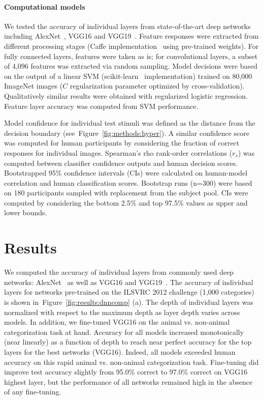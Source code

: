 \documentclass{article}
\begin{document}
\paragraph{Computational models}


We tested the accuracy of individual layers from state-of-the-art deep networks including AlexNet~\citep{Krizhevsky2012}, VGG16 and VGG19~\citep{Simonyan2014a}. Feature responses were extracted from different processing stages (Caffe implementation~\citep{jia2014} using pre-trained weights). For fully connected layers, features were taken as is; for  convolutional layers, a subset of 4,096 features was extracted via random sampling. Model decisions were based on the output of a linear SVM (scikit-learn~\citep{sklearn} implementation) trained on 80,000 ImageNet images ($C$ regularization parameter optimized by cross-validation). Qualitatively similar results were obtained with regularized logistic regression. Feature layer accuracy was computed from SVM performance. 


Model confidence for individual test stimuli was defined as the distance from the decision boundary (see~Figure~\ref{fig:methods:hyper}). A similar confidence score was computed for human participants by considering the fraction of correct responses for individual images. Spearman's rho rank-order correlations ($r_s$) was computed between classifier confidence outputs and human decision scores. Bootstrapped 95\% confidence intervals (CIs) were calculated on human-model correlation and human classification scores. Bootstrap runs (n=300) were based on 180 participants sampled with replacement from the subject pool. CIs were computed by considering the bottom 2.5\% and top 97.5\% values as upper and lower bounds.






\section{Results}


We computed the accuracy of individual layers from commonly used deep networks: AlexNet~\citep{Krizhevsky2012} as well as VGG16 and VGG19~\citep{Simonyan2014a}. The accuracy of individual layers for networks pre-trained on the ILSVRC 2012 challenge (1,000 categories) is shown in~Figure~\ref{fig:results:dnncomp} (a). The depth of individual layers was normalized with respect to the maximum depth as layer depth varies across models. In addition, we fine-tuned VGG16 on the animal vs. non-animal categorization task at hand. Accuracy for all models increased monotonically (near linearly) as a function of depth to reach near perfect accuracy for the top layers for the best networks (VGG16). Indeed, all models exceeded human accuracy on this rapid animal vs. non-animal categorization task. Fine-tuning did improve test accuracy slightly from 95.0\% correct to 97.0\% correct on VGG16 highest layer, but the performance of all networks remained high in the absence of any fine-tuning.
\end{document}
